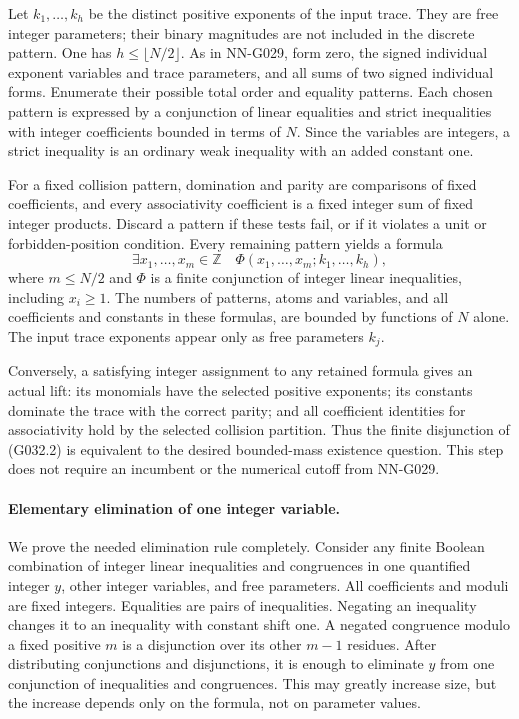 Let $k_1,\ldots,k_h$ be the distinct positive exponents of
the input trace. They are free integer parameters; their
binary magnitudes are not included in the discrete pattern.
One has $h\le\lfloor N/2\rfloor$.
As in NN-G029, form zero, the signed individual exponent
variables and trace parameters, and all sums of two signed
individual forms. Enumerate their possible total order
and equality patterns. Each chosen pattern is expressed
by a conjunction of linear equalities and strict
inequalities with integer coefficients bounded in terms
of $N$. Since the variables are integers, a strict
inequality is an ordinary weak inequality with an added
constant one.

For a fixed collision pattern, domination and parity are
comparisons of fixed coefficients, and every associativity
coefficient is a fixed integer sum of fixed integer products.
Discard a pattern if these tests fail, or if it violates a
unit or forbidden-position condition. Every remaining
pattern yields a formula
\[
 \exists x_1,\ldots,x_m\in\mathbb Z\quad
       \Phi(x_1,\ldots,x_m;k_1,\ldots,k_h),          \tag{G032.2}
\]
where $m\le N/2$ and $\Phi$ is a finite conjunction of
integer linear inequalities, including $x_i\ge1$.
The numbers of patterns, atoms and variables, and all
coefficients and constants in these formulas, are bounded
by functions of $N$ alone. The input trace exponents
appear only as free parameters $k_j$.

Conversely, a satisfying integer assignment to any retained
formula gives an actual lift: its monomials have the selected
positive exponents; its constants dominate the trace with
the correct parity; and all coefficient identities for
associativity hold by the selected collision partition.
Thus the finite disjunction of (G032.2) is equivalent to
the desired bounded-mass existence question. This step
does not require an incumbent or the numerical cutoff
from NN-G029.

\paragraph{Elementary elimination of one integer variable.}
We prove the needed elimination rule completely. Consider
any finite Boolean combination of integer linear inequalities
and congruences in one quantified integer $y$, other integer
variables, and free parameters. All coefficients and moduli
are fixed integers. Equalities are pairs of inequalities.
Negating an inequality changes it to an inequality with
constant shift one. A negated congruence modulo a fixed
positive $m$ is a disjunction over its other $m-1$ residues.
After distributing conjunctions and disjunctions, it is
enough to eliminate $y$ from one conjunction of inequalities
and congruences. This may greatly increase size, but the
increase depends only on the formula, not on parameter values.

